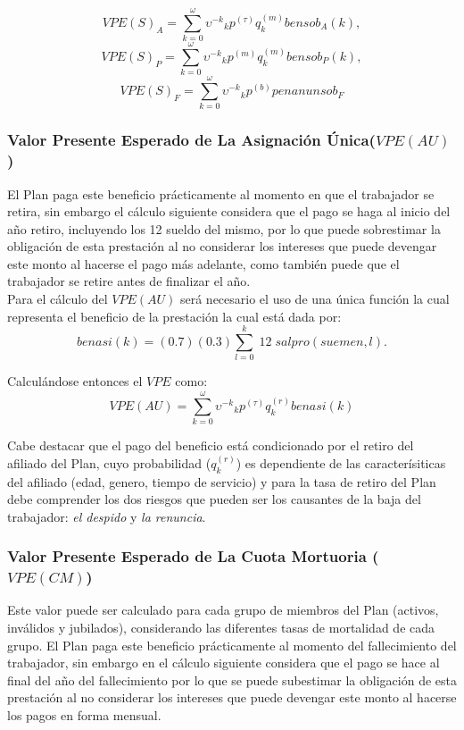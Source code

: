 \documentclass[12pt,letterpaper,titlepage]{article}
\begin{document}
{\[V\!PE(S)_{A}=\sum\limits_{k=0}^\omega\!\upsilon^{-k}\!_{k}p^{(\tau)}\!q_{k}^{(m)}\!bensob_{A}(k),\]
\[V\!PE(S)_{P}=\sum\limits_{k=0}^\omega\!\upsilon^{-k}\!_{k}p^{(m)}\!q_{k}^{(m)}\!bensob_{P}(k),\]
\[V\!PE(S)_{F}=\sum\limits_{k=0}^\omega\!\upsilon^{-k}\!_{k}p^{(b)}penanunsob_{F}\]


\subsubsection{Valor Presente Esperado de La Asignación Única($V\!PE(AU)$)}

El Plan paga este beneficio prácticamente al momento en que el trabajador se retira, sin embargo el cálculo siguiente considera que el pago se haga al inicio del año retiro, incluyendo los 12 sueldo del mismo, por lo que puede sobrestimar la obligación de esta prestación al no considerar los intereses que puede devengar este monto al hacerse el pago más adelante, como también puede que el trabajador se retire antes de finalizar el año. \\

Para el cálculo del  $V\!PE(AU)$ será necesario el uso de una única función la cual representa el beneficio de la prestación la cual está dada por:
\[benasi(k)=(0.7)(0.3)\sum\limits_{l=0}^{k}\;12\;sal\!pro(suemen,l).\]
 
Calculándose entonces el $VPE$ como:
\[ V\!PE(AU)=\sum\limits_{k=0}^{\omega}\!\upsilon^{-k}\!_{k}p^{(\tau)}\!q_{k}^{(r)}\!benasi(k)\]

Cabe destacar que el pago del beneficio está condicionado por el retiro del afiliado del Plan, cuyo probabilidad ($q_{k}^{(r)}$) es dependiente de las caracterísiticas del afiliado (edad, genero, tiempo de servicio) y para la tasa de retiro del Plan debe comprender los dos riesgos que pueden ser los causantes de la baja del trabajador: \textit{el despido} y \textit{la renuncia}.

\subsubsection{Valor Presente Esperado de La Cuota Mortuoria ($V\!PE(CM)$)}

Este valor puede ser calculado para cada grupo de miembros del Plan (activos, inválidos y jubilados), considerando las diferentes tasas de mortalidad de cada grupo. El Plan paga este beneficio prácticamente al momento del fallecimiento del trabajador, sin embargo en el cálculo siguiente considera que el pago se hace al final del año del fallecimiento por lo que se puede subestimar la obligación de esta prestación al no considerar los intereses que puede devengar este monto al hacerse los pagos en forma mensual.\\

}
\end{document}
